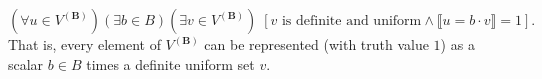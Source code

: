 $$(\forall u \in V^{(\mathbf{B})}) (\exists b \in B) (\exists v \in V^{(\mathbf{B})})\; [v \text{ is definite and uniform} \land \llbracket u = b \cdot v \rrbracket = 1].$$
That is, every element of $V^{(\mathbf{B})}$ can be represented (with truth value $1$) as a scalar $b \in B$ times a definite uniform set $v$.
